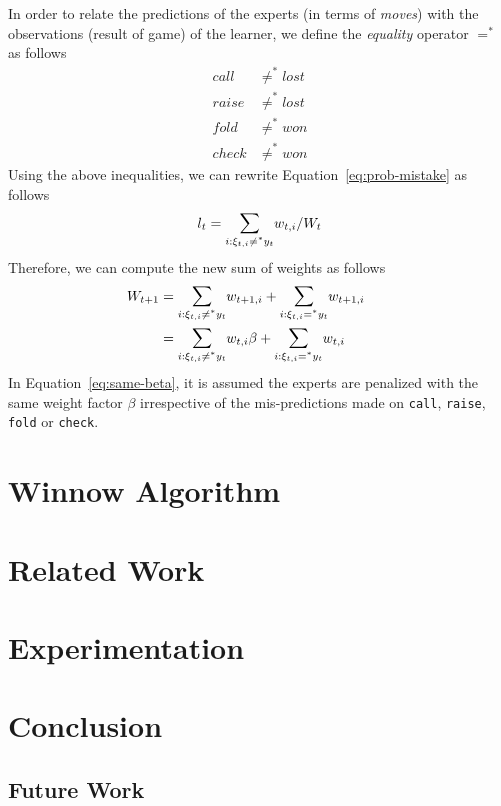 \documentclass[12pt]{article}
\begin{document}
\noindent In order to relate the predictions of the experts (in terms of {\em moves}) with the
observations (result of game) of the learner, we define the {\em equality} operator
$=^*$ as follows
\begin{align*}
call &\neq^* lost\\
raise &\neq^* lost\\
fold &\neq^* won\\
check &\neq^* won
\end{align*}
\noindent Using the above inequalities, we can rewrite Equation~\ref{eq:prob-mistake} as follows
\begin{align}
l_t = \Sum_{i:\xi_{t,i}\neq^*y_t}w_{t,i}/W_t
\end{align}
\noindent Therefore, we can compute the new sum of weights as follows
\begin{align}
W_{t+1} &= \Sum_{i:\xi_{t,i}\neq^*y_t}w_{t+1,i} + \Sum_{i:\xi_{t,i}=^*y_t}w_{t+1,i}\tag*{}\\
&= \Sum_{i:\xi_{t,i}\neq^*y_t}w_{t,i}\beta + \Sum_{i:\xi_{t,i}=^*y_t}w_{t,i}
\label{eq:same-beta}
\end{align}
\noindent In Equation~\ref{eq:same-beta}, it is assumed the experts are penalized with the same
weight factor $\beta$ irrespective of the mis-predictions made on \texttt{call}, \texttt{raise},
\texttt{fold} or \texttt{check}.



\section{Winnow Algorithm}

\section{Related Work}

\section{Experimentation}

\section{Conclusion}

\subsection{Future Work}
\end{document}
